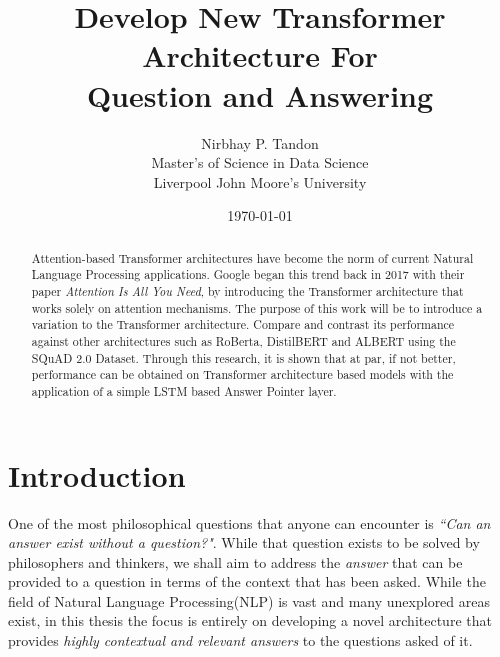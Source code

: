 \documentclass[a4paper,12pt]{report}
\begin{document}
    \title{Develop New Transformer Architecture For \\ Question and Answering}

    \author{Nirbhay P. Tandon\\ Master's of Science in Data Science\\Liverpool John Moore's University}

    \date{\vfill \monthyeardate\today}
    \maketitle


    \cleardoublepage%
    \tableofcontents
    \newpage
    \listoffigures
    \listoftables
    
    \printnomenclature[1in]
	\begin{abstract}
		Attention-based Transformer architectures have become the norm of current Natural Language Processing applications. Google began this trend back in 2017 with their paper \textit{Attention Is All You Need}, by introducing the Transformer architecture that works solely on attention mechanisms. The purpose of this work will be to introduce a variation to the Transformer architecture. Compare and contrast its performance against other architectures such as RoBerta, DistilBERT and ALBERT using the SQuAD 2.0 Dataset. Through this research, it is shown that at par, if not better, performance can be obtained on Transformer architecture based models with the application of a simple LSTM based Answer Pointer layer. 
		
	\end{abstract}
    \cleardoublepage%
    \chapter{Introduction}\label{c1introduction}

    One of the most philosophical questions that anyone can encounter is \textit{``Can an answer exist without a question?"}. While that question exists to be solved by philosophers and thinkers, we shall aim to address the \textit{answer} that can be provided to a question in terms of the context that has been asked. While the field of Natural Language Processing(NLP) is vast and many unexplored areas exist, in this thesis the focus is entirely on developing a novel architecture that provides \textit{highly contextual and relevant answers} to the questions asked of it.
\end{document}
